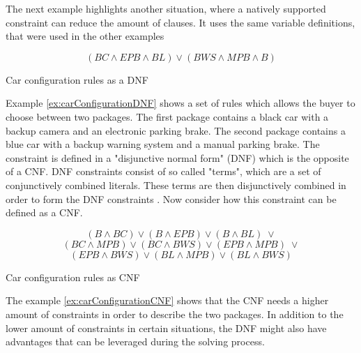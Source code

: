 The next example highlights another situation, where a natively supported constraint can reduce the amount of clauses. It uses the same variable definitions, that were used in the other examples

\begin{example}
\begin{leftbar}
\begin{displaymath}
(BC \wedge EPB \wedge BL) \vee (BWS \wedge MPB \wedge B)
\end{displaymath}
\end{leftbar}
\caption{Car configuration rules as a DNF}
\label{ex:carConfigurationDNF}
\end{example}

Example \ref{ex:carConfigurationDNF} shows a set of rules which allows the buyer to choose between two packages. The first package contains a black car with a backup camera and an electronic parking brake. The second package contains a blue car with a backup warning system and a manual parking brake. The constraint is defined in a "disjunctive normal form" (DNF) which is the opposite of a CNF. DNF constraints consist of so called "terms", which are a set of conjunctively combined literals. These terms are then disjunctively combined in order to form the DNF constraints \cite{biere2009handbook}. Now consider how this constraint can be defined as a CNF.

\begin{example}
\begin{leftbar}
\begin{displaymath}
(B \wedge BC) \vee (B \wedge EPB) \vee (B \wedge BL) \; \vee
\end{displaymath}
\begin{displaymath}
(BC \wedge MPB) \vee (BC \wedge BWS) \vee (EPB \wedge MPB) \; \vee
\end{displaymath}
\begin{displaymath}
(EPB \wedge BWS) \vee (BL \wedge MPB) \vee (BL \wedge BWS)
\end{displaymath}
\end{leftbar}
\caption{Car configuration rules as CNF}
\label{ex:carConfigurationCNF}
\end{example}

The example \ref{ex:carConfigurationCNF} shows that the CNF needs a higher amount of constraints in order to describe the two packages. In addition to the lower amount of constraints in certain situations, the DNF might also have advantages that can be leveraged during the solving process.

